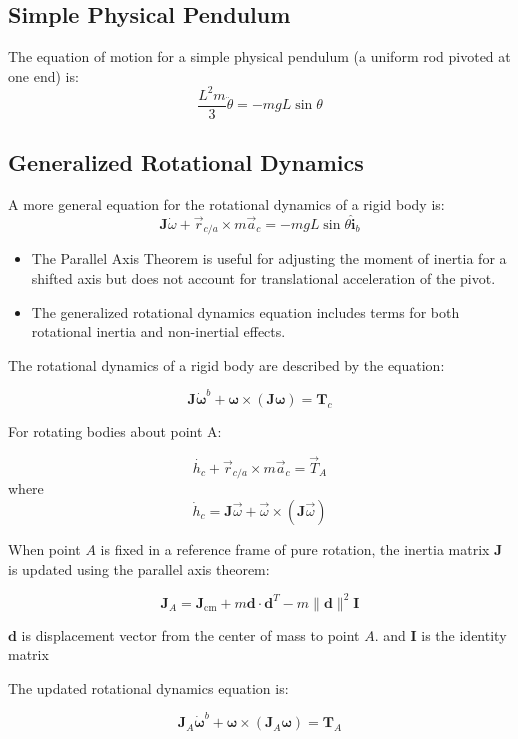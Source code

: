 \subsection{Simple Physical Pendulum}
The equation of motion for a simple physical pendulum (a uniform rod pivoted at one end) is:
\[
\frac{L^2 m}{3} \ddot{\theta} = -mgL \sin \theta
\]


\subsection{Generalized Rotational Dynamics}
A more general equation for the rotational dynamics of a rigid body is:
\[
\mathbf{J} \dot{\omega} + \vec{r}_{c/a} \times m \vec{a}_c = -mgL \sin \theta \hat{\mathbf{i}}_b
\]
\begin{itemize}
    \item The Parallel Axis Theorem is useful for adjusting the moment of inertia for a shifted axis but does not account for translational acceleration of the pivot.
    \item The generalized rotational dynamics equation includes terms for both rotational inertia and non-inertial effects.
\end{itemize}

The rotational dynamics of a rigid body are described by the equation:

\[
\mathbf{J} \dot{\boldsymbol{\omega}}^b + \boldsymbol{\omega} \times (\mathbf{J} \boldsymbol{\omega}) = \mathbf{T}_c
\]


For rotating bodies about point A:

\[
\dot{h_c} + \vec{r}_{c/a} \times m \vec{a}_c = \vec{T}_A
\]
where 
\[
\dot{h}_c = \mathbf{J} \vec{\omega} + \vec{\omega} \times (\mathbf{J} \vec{\omega})
\]

When point \( A \) is fixed in a reference frame of pure rotation, the inertia matrix \( \mathbf{J} \) is updated using the parallel axis theorem:

\[
\mathbf{J}_A = \mathbf{J}_{\text{cm}} + m \mathbf{d} \cdot \mathbf{d}^T - m \|\mathbf{d}\|^2 \mathbf{I}
\]

 $\textbf{d}$ is displacement vector from the center of mass to point \( A \). and $\textbf{I}$ is the identity matrix

The updated rotational dynamics equation is:

\[
\mathbf{J}_A \dot{\boldsymbol{\omega}}^b + \boldsymbol{\omega} \times (\mathbf{J}_A \boldsymbol{\omega}) = \mathbf{T}_A
\]


